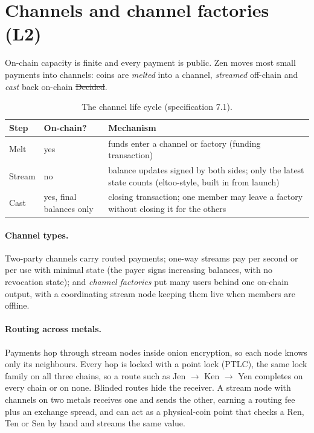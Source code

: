 \FloatBarrier
\section{Channels and channel factories (L2)}\label{sec:channels}

On-chain capacity is finite and every payment is public. Zen moves most small payments into channels: coins are \emph{melted} into a channel, \emph{streamed} off-chain and \emph{cast} back on-chain \st{Decided}.

\begin{table}[htbp]
\centering\small
\begin{tabularx}{\textwidth}{l l Y}
\toprule
\textbf{Step} & \textbf{On-chain?} & \textbf{Mechanism}\\
\midrule
Melt & yes & funds enter a channel or factory (funding transaction)\\
Stream & no & balance updates signed by both sides; only the latest state counts (eltoo-style, built in from launch)\\
Cast & yes, final balances only & closing transaction; one member may leave a factory without closing it for the others\\
\bottomrule
\end{tabularx}
\caption{The channel life cycle (specification 7.1).}
\end{table}

\paragraph{Channel types.} Two-party channels carry routed payments; one-way streams pay per second or per use with minimal state (the payer signs increasing balances, with no revocation state); and \emph{channel factories} put many users behind one on-chain output, with a coordinating stream node keeping them live when members are offline.

\paragraph{Routing across metals.} Payments hop through stream nodes inside onion encryption, so each node knows only its neighbours. Every hop is locked with a point lock (PTLC), the same lock family on all three chains, so a route such as Jen $\to$ Ken $\to$ Yen completes on every chain or on none. Blinded routes hide the receiver. A stream node with channels on two metals receives one and sends the other, earning a routing fee plus an exchange spread, and can act as a physical-coin point that checks a Ren, Ten or Sen by hand and streams the same value.

